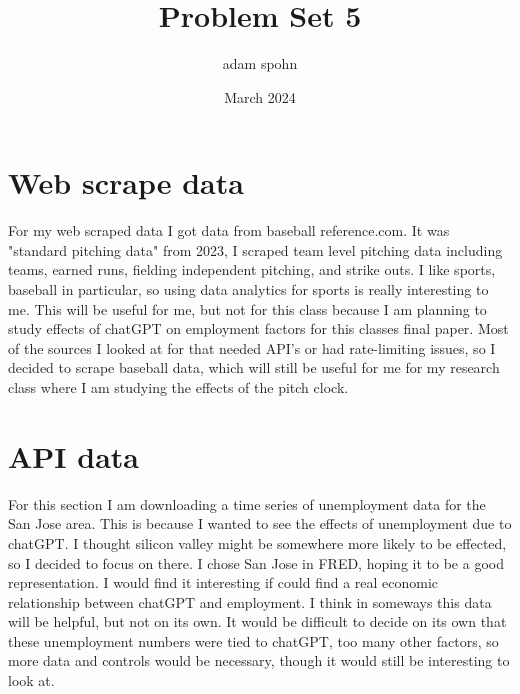 \documentclass{article}
\title{Problem Set 5}
\author{adam spohn}
\date{March 2024}
\begin{document}
\maketitle

\section{Web scrape data}

For my web scraped data I got data from baseball reference.com.
It was "standard pitching data" from 2023, I scraped team level 
pitching data including teams, earned runs, fielding independent
pitching, and strike outs. I like sports, baseball in particular, 
so using data analytics for sports is really interesting to me. This will be useful for me, but not for this class because I am planning to study effects of chatGPT on employment factors for this classes final paper. Most of the sources I looked at for that needed API's or had rate-limiting issues, so I decided to scrape baseball data, which will still be useful for me for my research class where I am studying the effects of the pitch clock. 

\section{API data}

For this section I am downloading a time series of  unemployment data for the San Jose area. This is because I wanted to see the effects of unemployment due to chatGPT. I thought silicon valley might be somewhere more likely to be effected, so I decided to focus on there. I chose San Jose in FRED, hoping it to be a good representation. I would find it interesting if could find a real economic relationship between chatGPT and employment. I think in someways this data will be helpful, but not on its own. It would be difficult to decide on its own that these unemployment numbers were tied to chatGPT, too many other factors, so more data and controls would be necessary, though it would still be interesting to look at. 
\end{document}

